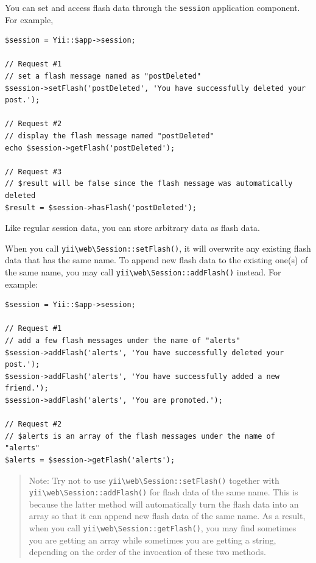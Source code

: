 You can set and access flash data through the \lstinline|session| application component. For example,

\lstset{language=php}\begin{lstlisting}
$session = Yii::$app->session;

// Request #1
// set a flash message named as "postDeleted"
$session->setFlash('postDeleted', 'You have successfully deleted your post.');

// Request #2
// display the flash message named "postDeleted"
echo $session->getFlash('postDeleted');

// Request #3
// $result will be false since the flash message was automatically deleted
$result = $session->hasFlash('postDeleted');
\end{lstlisting}
Like regular session data, you can store arbitrary data as flash data.

When you call \texttt{yii{\allowbreak{}\textbackslash}web{\allowbreak{}\textbackslash}Session\allowbreak{}::\allowbreak{}setFlash()}, it will overwrite any existing flash data that has the same name.
To append new flash data to the existing one(s) of the same name, you may call \texttt{yii{\allowbreak{}\textbackslash}web{\allowbreak{}\textbackslash}Session\allowbreak{}::\allowbreak{}addFlash()} instead.
For example:

\lstset{language=php}\begin{lstlisting}
$session = Yii::$app->session;

// Request #1
// add a few flash messages under the name of "alerts"
$session->addFlash('alerts', 'You have successfully deleted your post.');
$session->addFlash('alerts', 'You have successfully added a new friend.');
$session->addFlash('alerts', 'You are promoted.');

// Request #2
// $alerts is an array of the flash messages under the name of "alerts"
$alerts = $session->getFlash('alerts');
\end{lstlisting}
\begin{quote}Note: Try not to use \texttt{yii{\allowbreak{}\textbackslash}web{\allowbreak{}\textbackslash}Session\allowbreak{}::\allowbreak{}setFlash()} together with \texttt{yii{\allowbreak{}\textbackslash}web{\allowbreak{}\textbackslash}Session\allowbreak{}::\allowbreak{}addFlash()} for flash data
  of the same name. This is because the latter method will automatically turn the flash data into an array so that it
  can append new flash data of the same name. As a result, when you call \texttt{yii{\allowbreak{}\textbackslash}web{\allowbreak{}\textbackslash}Session\allowbreak{}::\allowbreak{}getFlash()}, you may
  find sometimes you are getting an array while sometimes you are getting a string, depending on the order of
  the invocation of these two methods.

\end{quote}
